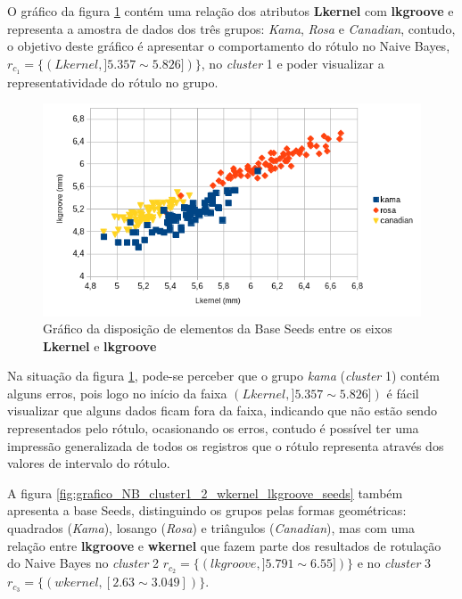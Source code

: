 O gráfico da figura  \ref{fig:grafico_NB_cluster1_lkernel_lkgroove_seeds} contém uma relação dos atributos \textbf{Lkernel} com \textbf{lkgroove} e representa a amostra de dados dos três grupos: \textit{Kama}, \textit{Rosa} e \textit{Canadian}, contudo, o objetivo deste gráfico é apresentar o comportamento do rótulo no Naive Bayes, $r_{c_1}=\{ (Lkernel, ] 5.357 \sim  5.826 ]) \} $, no \textit{cluster} 1 e poder visualizar a representatividade do rótulo no grupo. 

\begin{figure}[h!]
        \centering
        \includegraphics[scale=0.9]{figs/grafico_NB_cluster1_lkernel_lkgroove_seeds.png}
        \caption{Gráfico da disposição de elementos da Base Seeds entre os eixos \textbf{Lkernel} e \textbf{lkgroove}} \label{fig:grafico_NB_cluster1_lkernel_lkgroove_seeds}
\end{figure}


Na situação da figura \ref{fig:grafico_NB_cluster1_lkernel_lkgroove_seeds}, pode-se perceber que o grupo \textit{kama} (\textit{cluster} 1) contém alguns erros, pois logo no início da faixa $ (Lkernel, ] 5.357 \sim  5.826 ]) $ é fácil visualizar que alguns dados ficam fora da faixa, indicando que não estão sendo representados pelo rótulo, ocasionando os erros, contudo é possível ter uma impressão generalizada de todos os registros que o rótulo representa através dos valores de intervalo do rótulo. 

A figura \ref{fig:grafico_NB_cluster1_2_wkernel_lkgroove_seeds} também apresenta a base Seeds, distinguindo os grupos pelas formas geométricas: quadrados (\textit{Kama}), losango (\textit{Rosa}) e triângulos (\textit{Canadian}), mas com uma relação entre \textbf{lkgroove} e \textbf{wkernel} que fazem parte dos resultados de rotulação do Naive Bayes no \textit{cluster} 2 $r_{c_2}=\{ (lkgroove, ] 5.791 \sim  6.55]) \} $ e no \textit{cluster} 3 $r_{c_3}=\{ (wkernel, [2.63 \sim  3.049])\}$.
 
